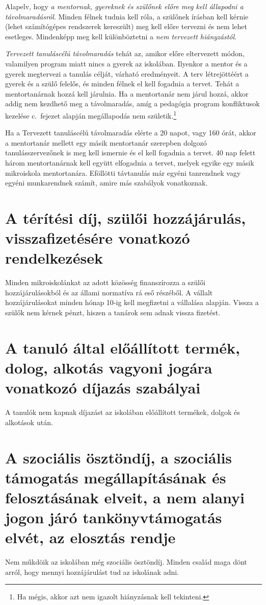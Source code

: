 \documentclass{article}
\begin{document}
Alapelv, hogy \emph{a mentornak, gyereknek és szülőnek előre meg kell állapodni a távolmaradásról}. Minden félnek tudnia kell róla, a szülőnek írásban kell kérnie (lehet számítógépes rendszerek kereszült) meg kell előre tervezni és nem lehet esetleges. Mindenképp meg kell különböztetni a \emph{nem tervezett hiányzástól}.

\emph{Tervezett tanuláscélú távolmaradás} tehát az, amikor előre eltervezett módon, valamilyen program miatt nincs a gyerek az iskolában. Ilyenkor a mentor és a gyerek megtervezi a tanulás célját, várható eredményeit. A terv létrejöttéért a gyerek és a szülő felelős, és minden félnek el kell fogadnia a tervet. Tehát a mentortanárnak hozzá kell járulnia. Ha a mentortanár nem járul hozzá, akkor addig nem kezdhető meg a távolmaradás, amíg a pedagógia program konfliktusok kezelése c.~fejezet alapján megállapodás nem születik.\footnote{Ha mégis, akkor azt nem igazolt hiányzásnak kell tekinteni.}

Ha a Tervezett tanuláscélú távolmaradás elérte a 20 napot, vagy 160 órát, akkor a mentortanár mellett egy másik mentortanár szerepben dolgozó tanulásszervezőnek is meg kell ismernie és el kell fogadnia a tervet. 40 nap felett három mentortanárnak kell együtt elfogadnia a tervet, melyek egyike egy másik mikroiskola mentortanára. Eföllötti távtanulás már egyéni tanrendnek vagy egyéni munkarendnek számít, amire más szabályok vonatkoznak.


\section{A térítési díj, szülői hozzájárulás, visszafizetésére vonatkozó rendelkezések}

Minden mikroiskolánkat az adott közösség finanszírozza a szülői hozzájárulásokból és az állami normatíva rá eső részéből. A vállalt hozzájárulásokat minden hónap 10-ig kell megfizetni a vállalása alapján. Vissza a szülők nem kérnek pénzt, hiszen a tanárok sem adnak vissza fizetést.

\section{A tanuló által előállított termék, dolog, alkotás vagyoni jogára vonatkozó díjazás szabályai}
A tanulók nem kapnak díjazást az iskolában előállított termékek, dolgok és alkotások után.

\section{A szociális ösztöndíj, a szociális támogatás megállapításának és felosztásának elveit, a nem alanyi jogon járó tankönyvtámogatás elvét, az elosztás rendje}
Nem műkdöik az iskolában még szociális ösztöndíj. Minden család maga dönt arról, hogy mennyi hozzájárulást tud az iskolának adni.
\end{document}
